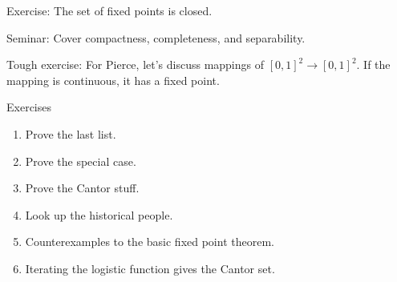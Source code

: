 \documentclass{article}
\begin{document}
Exercise: The set of fixed points is closed.

Seminar: Cover compactness, completeness, and separability.

Tough exercise: 
For Pierce, let's discuss mappings of $[0,1]^2\to [0,1]^2$.
If the mapping is continuous, it has a fixed point.

Exercises
\begin{enumerate}[1.]
    \item Prove the last list.
    \item Prove the special case.
    \item Prove the Cantor stuff.
    \item Look up the historical people.
    \item Counterexamples to the basic fixed point theorem.
    \item Iterating the logistic function gives the Cantor set.
\end{enumerate}
\end{document}

